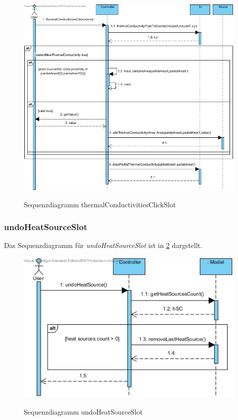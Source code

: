 \begin{figure}[H]
	\centering
	\includegraphics[scale=.6]{Bilder/Controller__thermalConductivitiesClickSlot().jpg}\\
	\caption{Sequenzdiagramm thermalConductivitiesClickSlot}
	\label{Sequenzdiagramm thermalConductivitiesClickSlot}
\end{figure}

\subsubsection*{undoHeatSourceSlot}

Das Sequenzdiagramm für \emph{undoHeatSourceSlot} ist in \ref{Sequenzdiagramm undoHeatSourceSlot} dargstellt.

\begin{figure}[H]
	\centering
	\includegraphics[scale=.6]{Bilder/Controller__undoHeatSourceSlot().jpg}\\
	\caption{Sequenzdiagramm undoHeatSourceSlot}
	\label{Sequenzdiagramm undoHeatSourceSlot}
\end{figure}

